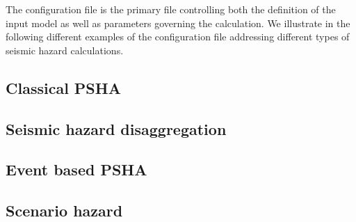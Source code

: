 The configuration file is the primary file controlling both the definition of
the input model as well as parameters governing the calculation. We illustrate
in the following different examples of the configuration file addressing
different types of seismic hazard calculations.


\subsection[Classical PSHA]{Classical PSHA}
\label{subsec:config_classical_psha}


\subsection{Seismic hazard disaggregation}
\label{subsec:config_hazard_disaggregation}


\subsection{Event based PSHA}
\label{subsec:config_event_based_psha}


\subsection{Scenario hazard}
\label{subsec:config_scenario_hazard}

